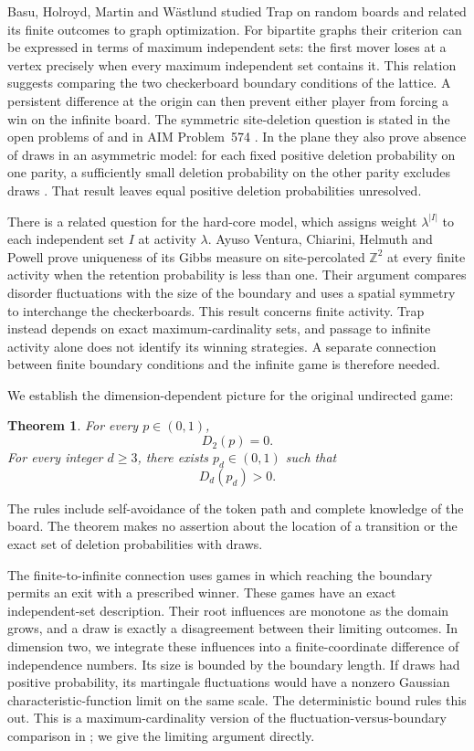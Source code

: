 \documentclass[11pt,a4paper]{article}
\newcommand{\Z}{\mathbb Z}
\newtheorem{theorem}{Theorem}[section]
\numberwithin{equation}{section}
\begin{document}
Basu, Holroyd, Martin and W\"astlund \cite{BHMW} studied Trap on random
boards and related its finite outcomes to graph optimization.
For bipartite graphs their criterion can be expressed in terms of maximum
independent sets: the first mover loses at a vertex precisely when every
maximum independent set contains it. This relation suggests comparing
the two checkerboard boundary conditions of the lattice.
A persistent difference at the origin can then prevent either player
from forcing a win on the infinite board. The symmetric site-deletion
question is stated in the open problems of \cite{BHMW} and in AIM
Problem~574 \cite{AIM574}.
In the plane they also prove absence of draws in an asymmetric model:
for each fixed positive deletion probability on one parity, a sufficiently
small deletion probability on the other parity excludes draws
\cite[Theorem~1(ii), arXiv version~1, page~3]{BHMW}.
That result leaves equal positive deletion probabilities unresolved.

There is a related question for the hard-core model, which assigns
weight $\lambda^{|I|}$ to each independent set $I$ at activity
$\lambda$. Ayuso Ventura, Chiarini, Helmuth and Powell \cite{AVCHP}
prove uniqueness of its Gibbs measure on site-percolated $\Z^2$ at
every finite activity when the retention probability is less than one.
Their argument compares disorder fluctuations with the size of the
boundary and uses a spatial symmetry to interchange the checkerboards.
This result concerns finite activity. Trap instead depends on exact
maximum-cardinality sets, and passage to infinite activity alone does
not identify its winning strategies. A separate connection between
finite boundary conditions and the infinite game is therefore needed.

We establish the dimension-dependent picture for the original
undirected game:
\begin{theorem}\label{thm:main}
For every $p\in(0,1)$,
\[
 D_2(p)=0.
\]
For every integer $d\ge3$, there exists $p_d\in(0,1)$ such that
\[
 D_d(p_d)>0.
\]
\end{theorem}
The rules include self-avoidance of the token path and complete knowledge
of the board. The theorem makes no assertion about the location of a
transition or the exact set of deletion probabilities with draws.

The finite-to-infinite connection uses games in which reaching the
boundary permits an exit with a prescribed winner. These games have
an exact independent-set description. Their root influences are
monotone as the domain grows, and a draw is exactly a disagreement
between their limiting outcomes. In dimension two, we integrate these
influences into a finite-coordinate difference of independence numbers.
Its size is bounded by the boundary length. If draws had positive
probability, its martingale fluctuations would have a nonzero Gaussian
characteristic-function limit on the same scale. The deterministic
bound rules this out. This is a maximum-cardinality version of the
fluctuation-versus-boundary comparison in \cite{AVCHP}; we give the
limiting argument directly.
\end{document}
